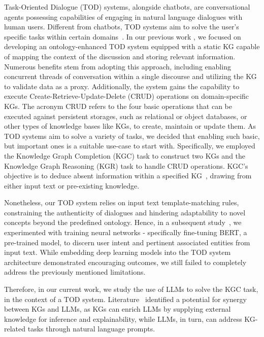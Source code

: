 \documentclass[runningheads]{llncs}
\begin{document}
Task-Oriented Dialogue (TOD) systems, alongside chatbots, are conversational agents possessing capabilities of engaging in natural language dialogues with human users. Different from chatbots, TOD systems aim to solve the user’s specific tasks within certain domains~\cite{chen2017}.
In our previous work \cite{iga2023}, we focused on developing an ontology-enhanced TOD system equipped with a static KG capable of mapping the context of the discussion and storing relevant information. 
Numerous benefits stem from adopting this approach, including enabling concurrent threads of conversation within a single discourse and utilizing the KG to validate data as a proxy. Additionally, the system gains the capability to execute Create-Retrieve-Update-Delete (CRUD) operations on domain-specific KGs. 
The acronym CRUD refers to the four basic operations that can be executed against persistent storages, such as relational or object databases, or other types of knowledge bases like KGs, to create, maintain or update them. As TOD systems aim to solve a variety of tasks, we decided that enabling such basic, but important ones is a suitable use-case to start with.
Specifically, we employed the Knowledge Graph Completion (KGC) task to construct two KGs and the Knowledge Graph Reasoning (KGR) task to handle CRUD operations. KGC’s objective is to deduce absent information within a specified KG~\cite{pan2023}, drawing from either input text or pre-existing knowledge.

Nonetheless, our TOD system relies on input text template-matching rules, constraining the authenticity of dialogues and hindering adaptability to novel concepts beyond the predefined ontology. 
Hence, in a subsequent study~\cite{iga2023-1}, we experimented with training neural networks - specifically fine-tuning BERT, a pre-trained model, to discern user intent and pertinent associated entities from input text. 
While embedding deep learning models into the TOD system architecture demonstrated encouraging outcomes, we still failed to completely address the previously mentioned limitations.

Therefore, in our current work, we study the use of LLMs to solve the KGC task, in the context of a TOD system.
 Literature~\cite{han2023,pan2023,zhang2021,zhu2023} identified a potential for synergy between KGs and LLMs, as KGs can enrich LLMs by supplying external knowledge for inference and explainability, while LLMs, in turn, can address KG-related tasks through natural language prompts.
\end{document}
